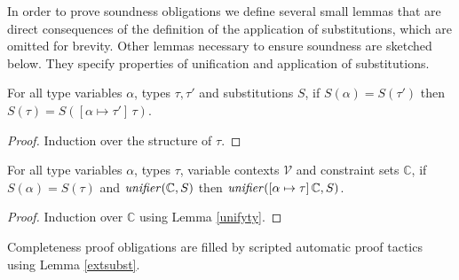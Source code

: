 In order to prove soundness obligations we define several small lemmas
that are direct consequences of the definition of the application of
substitutions, which are omitted for brevity. Other lemmas necessary
to ensure soundness are sketched below. They specify properties of
unification and application of substitutions.

\begin{Lemma}\label{unifyty}
For all type variables $\alpha$, types $\tau,\tau'$ and substitutions
$S$, if $S(\alpha) = S(\tau')$ then $S(\tau) = S([\alpha \mapsto
  \tau']\,\tau)$.
\end{Lemma}
\begin{proof}
Induction over the structure of $\tau$.
\end{proof}

\begin{Lemma}
For all type variables $\alpha$, types $\tau$, variable contexts
$\mathcal{V}$ and constraint sets $\mathbb{C}$, if $S(\alpha) = S(\tau)$
and $\text{\it unifier\/}(\mathbb{C},S)$ then
$\text{\it unifier\/}([\alpha\mapsto\tau]\,\mathbb{C},S)$.
\end{Lemma}
\begin{proof}
Induction over $\mathbb{C}$ using Lemma \ref{unifyty}.
\end{proof}

Completeness proof obligations are filled by scripted automatic proof tactics
using Lemma \ref{extsubst}.

%
